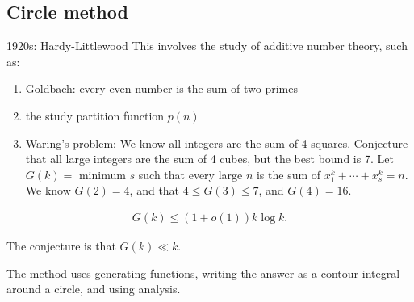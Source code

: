 \documentclass{article}
\newcommand{\1}{\mathbbm{1}}
\begin{document}
\subsection{Circle method}
1920s: Hardy-Littlewood
This involves the study of additive number theory, such as:
\begin{enumerate}
  \item Goldbach: every even number is the sum of two primes
  \item the study partition function $p(n)$
  \item Waring's problem: We know all integers are the sum of 4 squares. Conjecture that all large integers are the sum of 4 cubes, but the best bound is 7.
    Let $G(k) = $ minimum $s$ such that every large $n$ is the sum of $x_1^k + \dotsb + x_s^k = n$.
    We know $G(2) = 4$, and that $4 \leq G(3) \leq 7$, and $G(4) = 16$.
\end{enumerate}
\begin{thm}[Wooley, 1990]
  \begin{align*}
    G(k) \leq (1 + o(1)) k \log k.
  \end{align*}
\end{thm}
The conjecture is that $G(k) \ll k$.

The method uses generating functions, writing the answer as a contour integral around a circle, and using analysis.
\clearpage
\printnomenclature
\printindex
\end{document}
